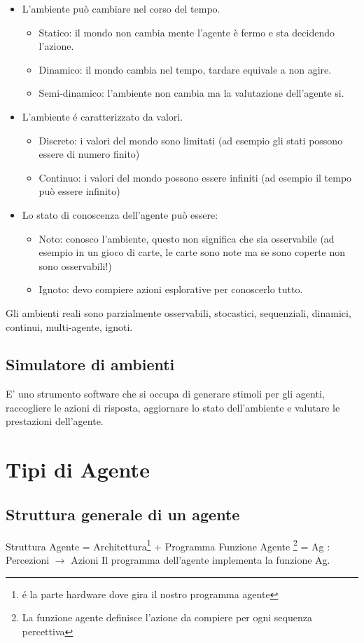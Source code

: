 \documentclass{article}
\begin{document}
\begin{itemize}
    \item L'ambiente può cambiare nel corso del tempo.
        \begin{itemize}
            \item Statico: il mondo non cambia mente l'agente è fermo e sta decidendo l'azione.
            \item Dinamico: il mondo cambia nel tempo, tardare equivale a non agire.
            \item Semi-dinamico: l'ambiente non cambia ma la valutazione dell'agente si.
        \end{itemize}
    \item L'ambiente é caratterizzato da valori.
        \begin{itemize}
            \item Discreto: i valori del mondo sono limitati (ad esempio gli stati possono essere di numero finito)
            \item Continuo: i valori del mondo possono essere infiniti (ad esempio il tempo può essere infinito)
        \end{itemize}
    \item Lo stato di conoscenza dell'agente può essere:
        \begin{itemize}
            \item Noto: conosco l'ambiente, questo non significa che sia osservabile (ad esempio in un gioco di carte, le carte sono note ma se sono coperte non sono osservabili!)
            \item Ignoto: devo compiere azioni esplorative per conoscerlo tutto.
        \end{itemize}
\end{itemize}
Gli ambienti reali sono parzialmente osservabili, stocastici, sequenziali, dinamici, continui, multi-agente, ignoti.

\subsection{Simulatore di ambienti}
E' uno strumento software che si occupa di generare stimoli per gli agenti, raccogliere le azioni di risposta, aggiornare lo stato dell'ambiente e valutare le prestazioni dell'agente.
\clearpage

\section{Tipi di Agente}
\subsection{Struttura generale di un agente}
Struttura Agente = Architettura\footnote{é la parte hardware dove gira il nostro programma agente} + Programma \newline
Funzione Agente \footnote{La funzione agente definisce l'azione da compiere per ogni sequenza percettiva} = Ag : Percezioni $\rightarrow$ Azioni \newline
Il programma dell'agente implementa la funzione Ag.
\end{document}
